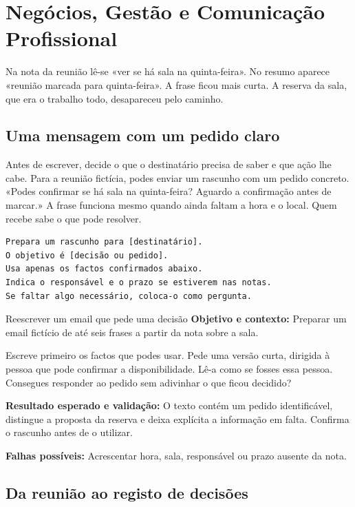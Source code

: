 \chapter{Negócios, Gestão e Comunicação Profissional}
\label{ch:negocios}

\ficcao Na nota da reunião lê-se «ver se há sala na quinta-feira». No resumo aparece «reunião marcada para quinta-feira». A frase ficou mais curta. A reserva da sala, que era o trabalho todo, desapareceu pelo caminho.

\section{Uma mensagem com um pedido claro}

Antes de escrever, decide o que o destinatário precisa de saber e que ação lhe cabe. Para a reunião fictícia, podes enviar um rascunho com um pedido concreto. «Podes confirmar se há sala na quinta-feira? Aguardo a confirmação antes de marcar.» A frase funciona mesmo quando ainda faltam a hora e o local. Quem recebe sabe o que pode resolver.

\begin{lstlisting}
Prepara um rascunho para [destinatário].
O objetivo é [decisão ou pedido].
Usa apenas os factos confirmados abaixo.
Indica o responsável e o prazo se estiverem nas notas.
Se faltar algo necessário, coloca-o como pergunta.
\end{lstlisting}

\begin{promptlabbox}{Reescrever um email que pede uma decisão}
\textbf{Objetivo e contexto:} Preparar um email fictício de até seis frases a partir da nota sobre a sala.

Escreve primeiro os factos que podes usar. Pede uma versão curta, dirigida à pessoa que pode confirmar a disponibilidade. Lê-a como se fosses essa pessoa. Consegues responder ao pedido sem adivinhar o que ficou decidido?

\textbf{Resultado esperado e validação:} O texto contém um pedido identificável, distingue a proposta da reserva e deixa explícita a informação em falta. Confirma o rascunho antes de o utilizar.

\textbf{Falhas possíveis:} Acrescentar hora, sala, responsável ou prazo ausente da nota.
\end{promptlabbox}

\section{Da reunião ao registo de decisões}

